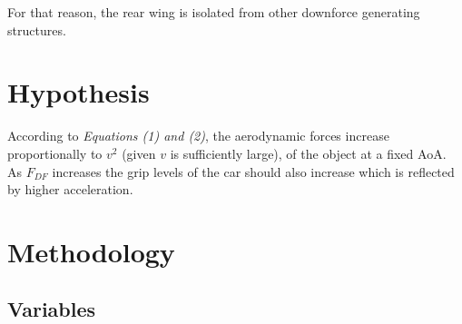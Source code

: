 \documentclass[11pt, a4paper]{article}
\begin{document}
For that reason, the rear wing is isolated from other downforce generating structures.

\section{Hypothesis}
According to \textit{Equations (1) and (2)}, the aerodynamic forces increase proportionally to $v^2$ (given $v$ is sufficiently large), of the object at a fixed AoA. As $F_{DF}$ increases the grip levels of the car should also increase which is
reflected by higher acceleration. 
\section{Methodology}
\subsection{Variables}
\end{document}
